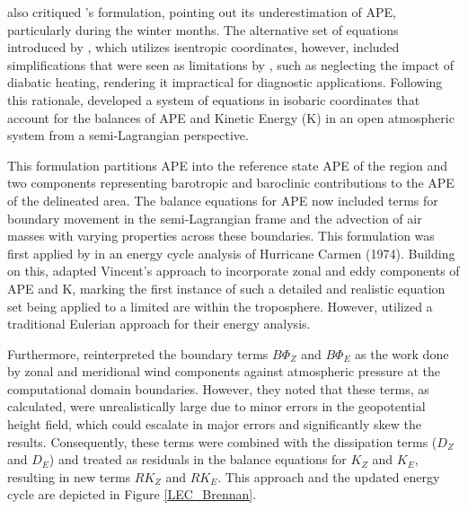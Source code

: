 \citet{dutton1967theory} also critiqued \citet{lorenz1955}'s formulation, pointing out its underestimation of APE, particularly during the winter months. The alternative set of equations introduced by \citet{johnson1970available}, which utilizes isentropic coordinates, however, included simplifications that were seen as limitations by \citet{vincent1973some}, such as neglecting the impact of diabatic heating, rendering it impractical for diagnostic applications. Following this rationale, \citet{vincent1973some} developed a system of equations in isobaric coordinates that account for the balances of APE and Kinetic Energy (K) in an open atmospheric system from a semi-Lagrangian perspective. 

This formulation partitions APE into the reference state APE of the region and two components representing barotropic and baroclinic contributions to the APE of the delineated area. The balance equations for APE now included terms for boundary movement in the semi-Lagrangian frame and the advection of air masses with varying properties across these boundaries. This formulation was first applied by \citet{edmon1979large} in an energy cycle analysis of Hurricane Carmen (1974). Building on this, \citet{brennan1980zonal} adapted Vincent's approach to incorporate zonal and eddy components of APE and K, marking the first instance of such a detailed and realistic equation set being applied to a limited are within the troposphere. However, \citet{brennan1980zonal} utilized a traditional Eulerian approach for their energy analysis.

Furthermore, \citet{brennan1980zonal} reinterpreted the boundary terms \(B\Phi_Z\) and \(B\Phi_E\) as the work done by zonal and meridional wind components against atmospheric pressure at the computational domain boundaries. However, they noted that these terms, as calculated, were unrealistically large due to minor errors in the geopotential height field, which could escalate in major errors and significantly skew the results. Consequently, these terms were combined with the dissipation terms (\(D_Z\) and \(D_E\)) and treated as residuals in the balance equations for \(K_Z\) and \(K_E\), resulting in new terms \(RK_Z\) and \(RK_E\). This approach and the updated energy cycle are depicted in Figure \ref{LEC_Brennan}.


